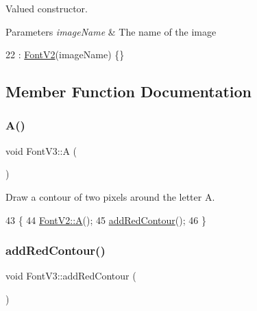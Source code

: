 Valued constructor. 


\begin{DoxyParams}{Parameters}
{\em image\+Name} & The name of the image \\
\hline
\end{DoxyParams}

\begin{DoxyCode}
22 : \mbox{\hyperlink{class_font_v2_aecf9c03af709aa99c23f5c785e798ef4}{FontV2}}(imageName) \{\}
\end{DoxyCode}


\subsection{Member Function Documentation}
\mbox{\label{class_font_v3_a41289cee13f84a1f9b9d893dfb4be5d4}} 
\subsubsection{\texorpdfstring{A()}{A()}}
{\footnotesize\ttfamily void Font\+V3\+::A (\begin{DoxyParamCaption}{ }\end{DoxyParamCaption})}



Draw a contour of two pixels around the letter A. 


\begin{DoxyCode}
43                \{
44     \mbox{\hyperlink{class_font_v2_ae1a96e014f4cc9e4447b0a2d947f4a33}{FontV2::A}}();
45     \mbox{\hyperlink{class_font_v3_a639f1eac0eb6724463813270f47e2696}{addRedContour}}();
46 \}
\end{DoxyCode}
\mbox{\label{class_font_v3_a639f1eac0eb6724463813270f47e2696}} 
\subsubsection{\texorpdfstring{add\+Red\+Contour()}{addRedContour()}}
{\footnotesize\ttfamily void Font\+V3\+::add\+Red\+Contour (\begin{DoxyParamCaption}{ }\end{DoxyParamCaption})}



